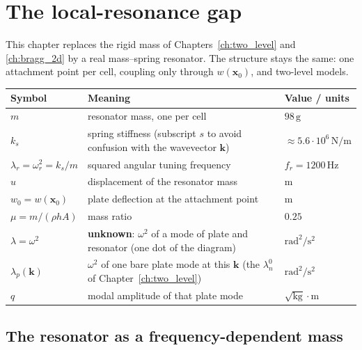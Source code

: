 
\chapter{The local-resonance gap}
\label{ch:local_resonance}

This chapter replaces the rigid mass of Chapters~\ref{ch:two_level} and
\ref{ch:bragg_2d} by a real mass--spring resonator. The structure stays the
same: one attachment point per cell, coupling only through
$w(\mathbf{x}_0)$, and two-level models.

\begin{center}
\begin{tabular}{|l|p{}|l|}
\hline
Symbol & Meaning & Value / units \\
\hline
$m$ & resonator mass, one per cell & $98\,\mathrm{g}$ \\
$k_s$ & spring stiffness (subscript $s$ to avoid confusion with the wavevector $\mathbf{k}$) & $\approx 5.6\cdot 10^6\,\mathrm{N/m}$ \\
$\lambda_r = \omega_r^2 = k_s/m$ & squared angular tuning frequency & $f_r = 1200\,\mathrm{Hz}$ \\
$u$ & displacement of the resonator mass & m \\
$w_0 = w(\mathbf{x}_0)$ & plate deflection at the attachment point & m \\
$\mu = m/(\rho h A)$ & mass ratio & $0.25$ \\
$\lambda = \omega^2$ & \textbf{unknown}: $\omega^2$ of a mode of plate and resonator (one dot of the diagram) & $\mathrm{rad^2/s^2}$ \\
$\lambda_p(\mathbf{k})$ & $\omega^2$ of one bare plate mode at this $\mathbf{k}$ (the $\lambda_n^0$ of Chapter~\ref{ch:two_level}) & $\mathrm{rad^2/s^2}$ \\
$q$ & modal amplitude of that plate mode & $\sqrt{\mathrm{kg}}\cdot\mathrm{m}$ \\
\hline
\end{tabular}
\end{center}

\section{The resonator as a frequency-dependent mass}

